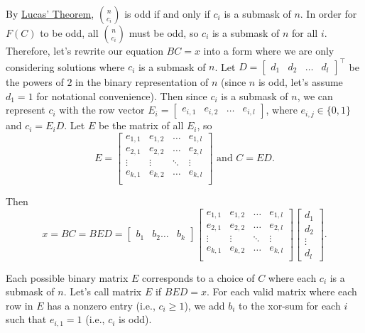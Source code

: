 \documentclass[11pt]{scrartcl}
\begin{document}
By \href{https://en.wikipedia.org/wiki/Lucas\%27s_theorem}{Lucas' Theorem}, ${n \choose c_i}$ is odd if and only if $c_i$ is a submask of $n$.
In order for $F(C)$ to be odd, all ${n \choose c_i}$ must be odd, so $c_i$ is a submask of $n$ for all $i$.
Therefore, let's rewrite our equation $BC = x$ into a form where we are only considering solutions where $c_i$ is a submask of $n$.
Let $D = \begin{bmatrix}
  d_1 & d_2 & \dots & d_l
\end{bmatrix}^\top$
be the powers of $2$ in the binary representation of $n$ (since $n$ is odd, let's assume $d_1 = 1$ for notational convenience).
Then since $c_i$ is a submask of $n$, we can represent $c_i$ with the row vector $E_i = \begin{bmatrix}
  e_{i, 1} & e_{i, 2} & \dots & e_{i, l}
\end{bmatrix}$, where $e_{i, j} \in \{0, 1\}$ and $c_i = E_i D$.
Let $E$ be the matrix of all $E_i$, so
\[
  E = \begin{bmatrix}
  e_{1, 1} & e_{1, 2} & \dots & e_{1, l} \\
  e_{2, 1} & e_{2, 2} & \dots & e_{2, l} \\
    \vdots & \vdots   & \ddots & \vdots \\
  e_{k, 1} & e_{k, 2} & \dots & e_{k, l} \\
  \end{bmatrix}
  \text{ and } C = ED.
\]

Then
\[
  x = BC = BED =
  \begin{bmatrix}
    b_1 & b_2 \dots & b_k
  \end{bmatrix}
  \begin{bmatrix}
  e_{1, 1} & e_{1, 2} & \dots & e_{1, l} \\
  e_{2, 1} & e_{2, 2} & \dots & e_{2, l} \\
    \vdots & \vdots   & \ddots & \vdots \\
  e_{k, 1} & e_{k, 2} & \dots & e_{k, l} \\
  \end{bmatrix}
  \begin{bmatrix}
    d_1 \\ d_2 \\ \vdots \\ d_l
  \end{bmatrix}.
\]

Each possible binary matrix $E$ corresponds to a choice of $C$ where each $c_i$ is a submask of $n$.
Let's call matrix $E$  if $BED = x$.
For each valid matrix where each row in $E$ has a nonzero entry (i.e., $c_i \geq 1$),
we add $b_i$ to the xor-sum for each $i$ such that $e_{i, 1} = 1$ (i.e., $c_i$ is odd).
\end{document}
